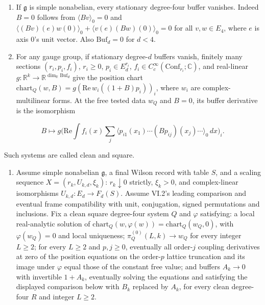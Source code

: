 \documentclass[
  letterpaper,
  11pt]{article}
\providecommand{\tightlist}{%
  \setlength{\itemsep}{0pt}\setlength{\parskip}{0pt}}
\begin{document}
\begin{enumerate}
\def\labelenumi{(\alph{enumi})}
\item
  If \(\mathfrak g\) is simple nonabelian, every stationary degree-four
  buffer vanishes. Indeed \(B=0\) follows from \(\langle Bv\rangle_0=0\)
  and \(\langle(Bv)(e)w(0)\rangle_0+\langle v(e)(Bw)(0)\rangle_0=0\) for
  all \(v,w\in E_4\), where \(e\) is axis \(0\)'s unit vector. Also
  \(\mathrm{Buf}_d=0\) for \(d<4\).
\item
  For any gauge group, if stationary degree-\(d\) buffers vanish,
  finitely many sections \((r_i,p_i,f_i)\), \(r_i\ge0\),
  \(p_i\in E_d^{r_i}\),
  \(f_i\in C_c^\infty(\mathrm{Conf}_{r_i};\mathbb C)\), and real-linear
  \(g:\mathbb R^k\to\mathbb R^{\dim_{\mathbb R}\mathrm{Buf}_d}\) give
  the position chart
  \(\mathrm{chart}_Q(w,B)=g(\mathrm{Re}\,w_i((1+B)p_i))_i\), where
  \(w_i\) are complex-multilinear forms. At the free tested data \(w_Q\)
  and \(B=0\), its buffer derivative is the isomorphism
\end{enumerate}

\[B\longmapsto g\Big(\mathrm{Re}\int f_i(x)\sum_j\langle p_{i1}(x_1)\cdots(Bp_{ij})(x_j)\cdots\rangle_0\,dx\Big)_i.\]

Such systems are called clean and square.

\begin{enumerate}
\def\labelenumi{(\alph{enumi})}
\setcounter{enumi}{2}
\tightlist
\item
  Assume simple nonabelian \(\mathfrak g\), a final Wilson record with
  table \(S\), and a scaling sequence \(X=(r_k,U_{k,d},\xi_k)\):
  \(r_k\downarrow0\) strictly, \(\xi_k>0\), and complex-linear
  isomorphisms \(U_{k,d}:E_d\to F_d(S)\). Assume VI.2's leading
  comparison and eventual frame compatibility with unit, conjugation,
  signed permutations and inclusions. Fix a clean square degree-four
  system \(Q\) and \(\varphi\) satisfying: a local real-analytic
  solution of
  \(\mathrm{chart}_Q(w,\varphi(w))=\mathrm{chart}_Q(w_Q,0)\), with
  \(\varphi(w_Q)=0\) and local uniqueness; \(\pi_Q^{(0)}(L,k)\to w_Q\)
  for every integer \(L\ge2\); for every \(L\ge2\) and \(p,j\ge0\),
  eventually all order-\(j\) coupling derivatives at zero of the
  position equations on the order-\(p\) lattice truncation and its image
  under \(\varphi\) equal those of the constant free value; and buffers
  \(A_k\to0\) with invertible \(1+A_k\), eventually solving the
  equations and satisfying the displayed comparison below with \(B_k\)
  replaced by \(A_k\), for every clean degree-four \(R\) and integer
  \(L\ge2\).
\end{enumerate}
\end{document}
